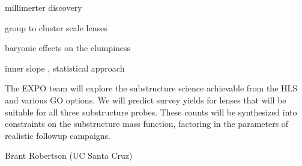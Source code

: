 \documentclass[11pt]{article}
\begin{document}
millimerter discovery \citep{everett2020a}

group to cluster scale lenses \citep{jaelani2020a}

baryonic effects on the clumpiness \citep{garrison-kimmel2017a,graus2018a}

inner slope \citep{wong2017a}, statistical approach \citep{diaz_rivero2018a}

The EXPO team will explore the substructure science achievable from the HLS and various GO
options. We will predict survey yields for lenses that will be suitable for all three substructure
probes. These counts will be synthesized into constraints on the substructure mass function,
factoring in the parameters of realistic followup campaigns.
\clearpage

\noindent %


\def\apj{\it{ApJ}}                  
\def\apjl{\it{ApJL}}
\def\araa{\it{ARAA}}
\def\mnras{\it{MNRAS}}
\def\nat{\it{Nature}}
\def\prd{\it{Phys. Rev. D}}





\vspace{4in}


Brant Robertson (UC Santa Cruz)
\end{document}
